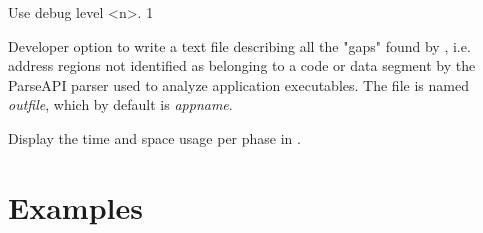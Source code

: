 \documentclass[english]{article}
\begin{document}
\begin{Description}
\item[\OptArg{--debug}{<n>}]
Use debug level <n>.  {1}

% 
% 
%
\item[\Opt{--show-gaps}]
Developer option to
write a text file describing all the "gaps" found by ,
i.e. address regions not identified as belonging to a code or data segment
by the ParseAPI parser used to analyze application executables.
The file is named \emph{outfile}, which by default is
\emph{appname}.

\item[\Opt{--time}]
Display the time and space usage per phase in .

\end{Description}



\section{Examples}
\end{document}

